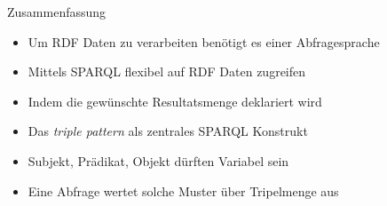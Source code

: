 \documentclass{beamer}
\begin{document}
\begin{frame}{Zusammenfassung}
	
	\begin{itemize}
		\item Um RDF Daten zu verarbeiten benötigt es einer Abfragesprache
		\item Mittels SPARQL flexibel auf RDF Daten zugreifen
		\item Indem die gewünschte Resultatsmenge deklariert wird
		\item Das \emph{triple pattern} als zentrales SPARQL Konstrukt
		\item Subjekt, Prädikat, Objekt dürften Variabel sein
		\item Eine Abfrage wertet solche Muster über Tripelmenge aus
	\end{itemize}
	
\end{frame}
\end{document}
